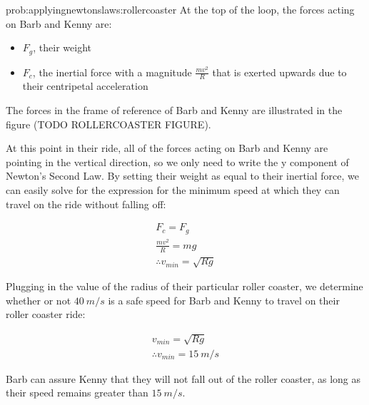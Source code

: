 \begin{solution}{prob:applyingnewtonslaws:rollercoaster}\label{soln:applyingnewtonslaws:rollercoaster} 
At the top of the loop, the forces acting on Barb and Kenny are:
\begin{itemize}
\item $F_g$, their weight
\item $F_c$, the inertial force with a magnitude $\frac{mv^{2}}{R}$ that is exerted upwards due to their centripetal acceleration
\end{itemize}

The forces in the frame of reference of Barb and Kenny are illustrated in the figure (TODO ROLLERCOASTER FIGURE).

At this point in their ride, all of the forces acting on Barb and Kenny are pointing in the vertical direction, so we only need to write the y component of Newton's Second Law. By setting their weight as equal to their inertial force, we can easily solve for the expression for the minimum speed at which they can travel on the ride without falling off:

\begin{align*}
F_c=F_g \\
\frac{mv^{2}}{R}=mg \\
\therefore v_{min}=\sqrt{Rg} 
\end{align*}

Plugging in the value of the radius of their particular roller coaster, we determine whether or not $\SI{40}{m/s}$ is a safe speed for Barb and Kenny to travel on their roller coaster ride:

\begin{align*}
v_{min}=\sqrt{Rg} \\
\therefore v_{min}=\SI{15}{m/s}
\end{align*}

Barb can assure Kenny that they will not fall out of the roller coaster, as long as their speed remains greater than $\SI{15}{m/s}$.

\end{solution}



